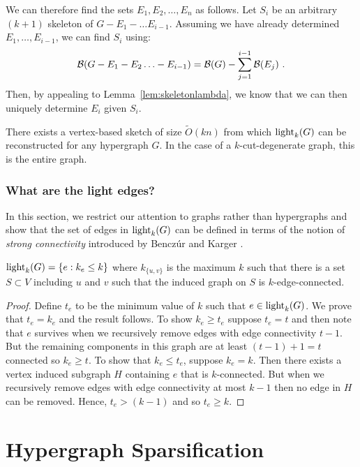 We can therefore find the sets $E_1, E_2, \ldots, E_n$ as follows. Let
$S_i$ be an arbitrary $(k+1)$ skeleton of $G-E_1-\ldots E_{i-1}$. Assuming we have already determined $E_1, \ldots, E_{i-1}$, we can find $S_i$ using:
\[
{\cal B}(G-E_1-E_2\ldots - E_{i-1})={\cal B}(G)-\sum_{j=1}^{i-1} {\cal B}(E_j) \ .
\]
Then, by appealing to Lemma~\ref{lem:skeletonlambda}, we know that we can then uniquely determine $E_i$ given $S_i$.

\begin{theorem}
There exists a vertex-based sketch of size $\tilde{O}(kn)$ from which  $\operatorname{{light}}_k(G)$ can be reconstructed for any hypergraph $G$. 
In the case of a $k$-cut-degenerate graph, this is the entire graph.
\end{theorem}

\subsubsection{What are the light edges?}
In this section, we restrict our attention to graphs rather than hypergraphs and show that the set of edges in $\operatorname{{light}}_k(G)$ can be defined in terms of the notion of \emph{strong connectivity} introduced by Bencz{\'u}r and Karger \cite{BenczurK96}. 


\begin{lemma} $\operatorname{{light}}_k(G)=\{e:k_e\leq k\}$ where $k_{\{u,v\}}$ is the maximum $k$ such that there is a set $S\subset V$ including $u$ and $v$ such that the induced graph on $S$ is $k$-edge-connected.
\end{lemma}
\begin{proof}
Define $t_e$ to be the minimum value of $k$ such that $e\in  \operatorname{{light}}_k(G)$. We  prove that $t_e=k_e$ and the result  follows.
To show $k_e \geq t_e$ suppose $t_e = t$ and then note that $e$ survives when we recursively remove edges with edge connectivity $t-1$. But the remaining components in this graph are at least $(t-1)+1=t$ connected so $k_e\geq t$.
To show that $k_e\leq t_e$, suppose $k_e=k$. Then there exists a vertex induced subgraph $H$ containing $e$ that is $k$-connected. But when we recursively remove edges with edge connectivity at most $k-1$ then no edge in $H$ can be removed. Hence, $t_e> (k-1)$ and so $t_e\geq k$.
\end{proof}

\section{Hypergraph Sparsification}
\label{sec:hypesparsification}

